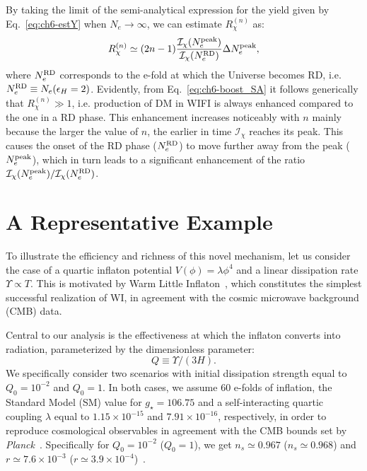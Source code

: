 By taking the limit of the semi-analytical expression for the yield given by Eq.~\eqref{eq:ch6-estY} when $N_e\rightarrow\infty$, we can estimate $R^{(n)}_{\chi}$ as:
\begin{eqnarray}
    R_\chi^{(n)}\simeq (2n-1) \frac{\mathcal{I}_\chi (N_e^{\rm{peak}})}{\mathcal{I}_\chi (N_e^{\rm{RD}})}\Delta N_e^{\rm{peak}}, \label{eq:ch6-boost_SA}
\end{eqnarray}
where $N_e^{\rm{RD}}$ corresponds to the e-fold at which the Universe becomes RD, i.e. $N_e^{\rm{RD}}\equiv N_e(\epsilon_H=2)$.
Evidently, from Eq.~\eqref{eq:ch6-boost_SA} it follows generically that $R_\chi^{(n)}\gg 1$, i.e. production of DM in WIFI is always enhanced compared to the one in a RD phase. This enhancement increases noticeably with $n$ mainly because the larger the value of $n$, the earlier in time $\mathcal{I}_\chi$ reaches its peak. This causes the onset of the RD phase ($N_e^{\rm{RD}}$) to move further away from the peak ($N_e^{\rm{peak}}$), which in turn leads to a significant enhancement of the ratio $\mathcal{I}_\chi (N_e^{\rm{peak}})/\mathcal{I}_\chi (N_e^{\rm{RD}})$.

\section{A Representative Example}
\label{sec:ch6-example}

To illustrate the efficiency and richness of this novel mechanism, let us consider the case of a quartic inflaton potential $V(\phi)=\lambda \phi^4$ and a linear dissipation rate $\Upsilon\propto T$. This is motivated by
 Warm Little Inflaton~\cite{Bastero-Gil:2016qru, Bastero-Gil:2019gao}, which constitutes the simplest successful realization of WI, in agreement with the cosmic microwave background (CMB) data.

 Central to our analysis is the effectiveness at which the inflaton converts into radiation, parameterized by the dimensionless parameter:
\begin{equation}
    Q\equiv \Upsilon/(3H).
\end{equation}
 We specifically consider two
 scenarios with initial dissipation strength  equal to $Q_0=10^{-2}$ and $Q_0=1$. In both cases, we assume 60 e-folds of inflation, the Standard Model (SM) value for $g_\star=106.75$ and a self-interacting quartic coupling $\lambda$ equal to $1.15\times10^{-15}$ and $7.91\times10^{-16}$, respectively, in order to reproduce cosmological observables in agreement with the CMB bounds set by \textit{Planck}~\cite{Planck:2018jri}. Specifically for $Q_0=10^{-2}$ ($Q_0=1$), we get  $n_s\simeq0.967$ ($n_s\simeq 0.968$) and $r\simeq7.6\times 10^{-3}$ ($r\simeq3.9\times 10^{-4}$)~\cite{Montefalcone:2023pvh}.

